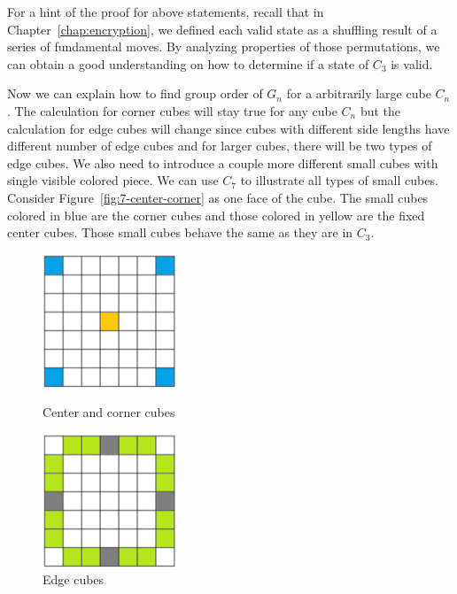 \par For a hint of the proof for above statements, recall that in Chapter~\ref{chap:encryption}, we defined each valid state as a shuffling result of a series of fundamental moves. By analyzing properties of those permutations, we can obtain a good understanding on how to determine if a state of $C_3$ is valid.
\par Now we can explain how to find group order of $G_n$ for a arbitrarily large cube $C_n$. The calculation for corner cubes will stay true for any cube $C_n$ but the calculation for edge cubes will change since cubes with different side lengths have different number of edge cubes and for larger cubes, there will be two types of edge cubes. We also need to introduce a couple more different small cubes with single visible colored piece. We can use $C_7$ to illustrate all types of small cubes. Consider Figure~\ref{fig:7-center-corner} as one face of the cube. The small cubes colored in blue are the corner cubes and those colored in yellow are the fixed center cubes. Those small cubes behave the same as they are in $C_3$.
\begin{figure}[ht]
    \centering
    \begin{minipage}{0.45\textwidth}
        \centering
        \includegraphics[width=4cm]{figures/structure/7_grid_center_corner.png}
        \caption{Center and corner cubes}\label{fig:7-center-corner}
    \end{minipage}
    \begin{minipage}{0.45\textwidth}
        \centering
        \includegraphics[width=4cm]{figures/structure/7_grid_edge.png}
        \caption{Edge cubes}\label{fig:7-edge}
    \end{minipage}
\end{figure}

